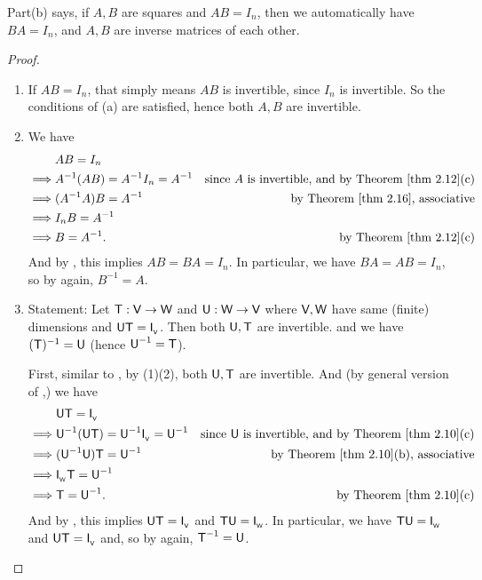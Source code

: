 \begin{note}
Part(b) says, if \(A, B\) are squares and \(AB = I_n\), then we automatically have \(BA = I_n\), and \(A, B\) are inverse matrices of each other.
\end{note}

\begin{proof} \ 
\begin{enumerate}
\item If \(AB = I_n\), that simply means \(AB\) is invertible, since \(I_n\) is invertible.
So the conditions of \EXEC{2.4.9}(a) are satisfied, hence both \(A, B\) are invertible.

\item We have
\begin{align*}
             & AB = I_n \\
    \implies & A^{-1} (AB) = A^{-1} I_n = A^{-1} & \text{since \(A\) is invertible, and by \THM{2.12}(c)} \\
    \implies & (A^{-1}A)B = A^{-1} & \text{by \THM{2.16}, associative} \\
    \implies & I_n B = A^{-1} \\
    \implies & B = A^{-1}. & \text{by \THM{2.12}(c)}
\end{align*}
And by , this implies \(AB = BA = I_n\).
In particular, we have \(BA = AB = I_n\), so by  again, \(B^{-1} = A\).

\item
Statement: Let \(\textsf{T} : \textsf{V} \to \textsf{W}\) and \(\textsf{U} : \textsf{W} \to \textsf{V}\) where \(\textsf{V}, \textsf{W}\) have same (finite) dimensions and \(\textsf{U}\textsf{T} = \textsf{I}_{_{\textsf{V}}}\).
Then both \(\textsf{U}, \textsf{T}\) are invertible. and we have \((\textsf{T})^{-1} = \textsf{U}\) (hence \(\textsf{U}^{-1} = \textsf{T}\)).

First, similar to , by (1)(2), both \(\textsf{U}, \textsf{T}\) are invertible.
And (by general version of \THM{2.10},) we have
\begin{align*}
             & \U\T = \ITRANV \\
    \implies & \U^{-1} (\U\T) = \U^{-1} \ITRANV = \U^{-1} & \text{since \(\U\) is invertible, and by \THM{2.10}(c)} \\
    \implies & (\U^{-1}\U)\T = \U^{-1} & \text{by \THM{2.10}(b), associative} \\
    \implies & \ITRANW \T = \U^{-1} \\
    \implies & \T = \U^{-1}. & \text{by \THM{2.10}(c)}
\end{align*}
And by , this implies \(\textsf{U}\textsf{T} = \textsf{I}_{_{\textsf{V}}}\) and \(\textsf{T}\textsf{U} = \textsf{I}_{_{\textsf{W}}}\).
In particular, we have \(\textsf{T}\textsf{U} = \textsf{I}_{_{\textsf{W}}}\) and \(\textsf{U}\textsf{T} = \textsf{I}_{_{\textsf{V}}}\) and, so by  again, \(\textsf{T}^{-1} = \textsf{U}\).
\end{enumerate}
\end{proof}


